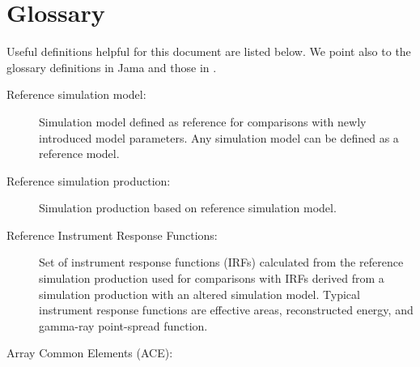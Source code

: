 
\section{Glossary}

Useful definitions helpful for this document are listed below.
We point also to the glossary definitions in Jama and those in  \cite{CTAConcept}.

\begin{description}

\item[Reference simulation model:] 
Simulation model defined as reference for comparisons with newly introduced model parameters.
Any simulation model can be defined as a reference model.

\item[Reference simulation production: ]
Simulation production based on reference simulation model. 

\item[Reference Instrument Response Functions: ]  
Set of instrument response functions (IRFs) calculated from the reference simulation production used for comparisons with IRFs derived from a simulation production with an altered simulation model.
Typical instrument response functions are effective areas, reconstructed energy, and gamma-ray point-spread function.

\item[Array Common Elements (ACE): ]

\end{description}


